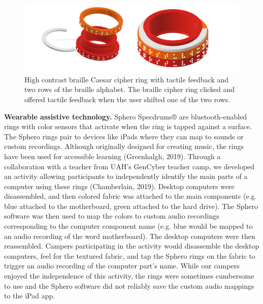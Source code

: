 \documentclass[11.5pt]{sig-alternate} %
\begin{document}
\begin{large}
\begin{figure}[ht]
    \centering
    \includegraphics[width=1\linewidth]{1117_Fig2.png}
    \caption{High contrast braille Caesar cipher ring with tactile feedback and two rows of the braille alphabet. The braille cipher ring clicked and offered tactile feedback when the user shifted one of the two rows.}
\end{figure}

\textbf{Wearable assistive technology.} Sphero Specdrums® are bluetooth-enabled rings with color sensors that activate when the ring is tapped against a surface. The Sphero rings pair to devices like iPads where they can map to sounds or custom recordings. Although originally designed for creating music, the rings have been used for accessible learning (Greenhalgh, 2019). Through a collaboration with a teacher from UAH’s GenCyber teacher camp, we developed an activity allowing participants to independently identify the main parts of a computer using these rings (Chamberlain, 2019). Desktop computers were disassembled, and then colored fabric was attached to the main components (e.g. blue attached to the motherboard, green attached to the hard drive). The Sphero software was then used to map the colors to custom audio recordings corresponding to the computer component name (e.g. blue would be mapped to an audio recording of the word motherboard). The desktop computers were then reassembled. Campers participating in the activity would disassemble the desktop computers, feel for the textured fabric, and tap the Sphero rings on the fabric to trigger an audio recording of the computer part’s name. While our campers enjoyed the independence of this activity, the rings were sometimes cumbersome to use and the Sphero software did not reliably save the custom audio mappings to the iPad app.


\end{large}
\end{document}
